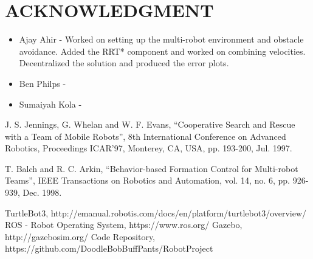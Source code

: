 \documentclass[letterpaper, 10 pt, conference]{ieeeconf}  %
\begin{document}
	\addtolength{\textheight}{-12cm}   %
	
	\section{ACKNOWLEDGMENT}
	
	\begin{itemize}
		\item Ajay Ahir - Worked on setting up the multi-robot environment and obstacle avoidance. Added the RRT* component and worked on combining velocities. Decentralized the solution and produced the error plots.
		\item Ben Philps - 
		\item Sumaiyah Kola - 
	\end{itemize}
	
	\begin{thebibliography}{99}
		
		 J. S. Jennings, G. Whelan and W. F. Evans, ``Cooperative Search and Rescue with a Team of Mobile Robots'', 8th International Conference on Advanced Robotics, Proceedings ICAR'97, Monterey, CA, USA, pp. 193-200, Jul. 1997.
		
		 T. Balch and R. C. Arkin, ``Behavior-based Formation Control for Multi-robot Teams'', IEEE Transactions on Robotics and Automation, vol. 14, no. 6, pp. 926-939, Dec. 1998.
		
		 TurtleBot3, http://emanual.robotis.com/docs/en/platform/turtlebot3/overview/
		 ROS - Robot Operating System, https://www.ros.org/
		 Gazebo, http://gazebosim.org/
		 Code Repository, https://github.com/DoodleBobBuffPants/RobotProject
		
	\end{thebibliography}
	
\end{document}
